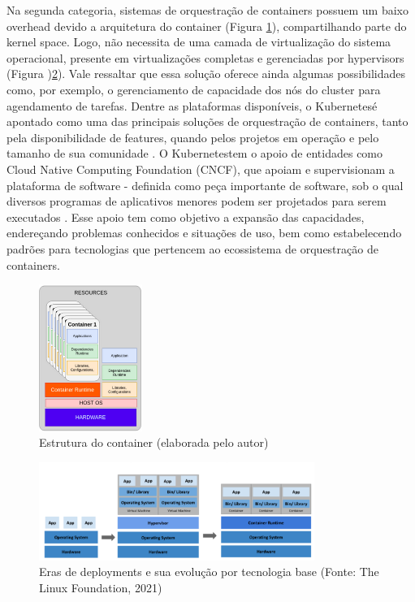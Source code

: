 Na segunda categoria, sistemas de orquestração de containers possuem um baixo overhead devido a arquitetura do container (Figura \ref{fig:container}), compartilhando parte do kernel space. Logo, não necessita de uma camada de virtualização do sistema operacional, presente em virtualizações completas e gerenciadas por hypervisors (Figura )\ref{fig:vmscontainer}). Vale ressaltar que essa solução oferece ainda algumas possibilidades como, por exemplo,  o gerenciamento de capacidade dos nós do cluster para agendamento de tarefas. Dentre as plataformas disponíveis, o Kubernetes\textregistered é apontado como uma das principais soluções de orquestração de containers, tanto pela disponibilidade de features, quando pelos projetos em operação e pelo tamanho de sua comunidade \cite{truyen_comprehensive_2021}. O Kubernetes\textregistered tem o apoio de entidades como Cloud Native Computing Foundation (CNCF), que apoiam e supervisionam a plataforma de software -  definida como peça importante de software, sob o qual diversos programas de aplicativos menores podem ser projetados para serem executados \cite{collins2022}. Esse apoio tem como objetivo a expansão  das capacidades, endereçando problemas conhecidos e situações de uso, bem como estabelecendo padrões para tecnologias que pertencem ao ecossistema de orquestração de containers.

\begin{figure}[!h]
    \centering
    \includegraphics[width=0.3\textwidth]{04-figuras/containers.png}
    \caption{Estrutura do container (elaborada pelo autor)}
    \label{fig:container}
\end{figure}

\begin{figure}[!h]
    \centering
    \includegraphics[width=0.8\textwidth]{04-figuras/vmsContainer.png}
    \caption{Eras de deployments e sua evolução por tecnologia base (Fonte: The Linux Foundation\textregistered, 2021)}
    \label{fig:vmscontainer}
\end{figure}

